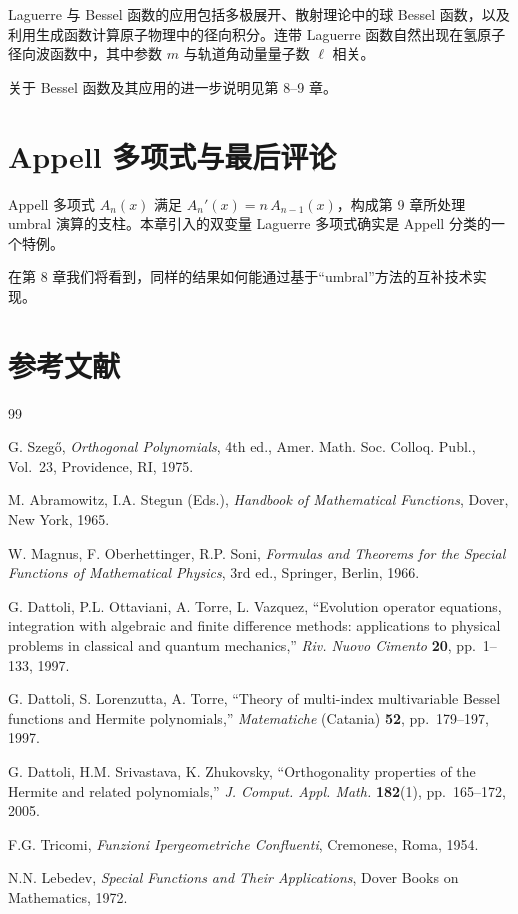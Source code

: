 Laguerre 与 Bessel 函数的应用包括多极展开、散射理论中的球 Bessel 函数，以及利用生成函数计算原子物理中的径向积分。连带 Laguerre 函数自然出现在氢原子径向波函数中，其中参数 $m$ 与轨道角动量量子数 $\ell$ 相关。

关于 Bessel 函数及其应用的进一步说明见第 8--9 章。

\section{Appell 多项式与最后评论}

Appell 多项式 $A_n(x)$ 满足 $A_n'(x) = n\,A_{n-1}(x)$，构成第 9 章所处理 umbral 演算的支柱。本章引入的双变量 Laguerre 多项式确实是 Appell 分类的一个特例。

在第 8 章我们将看到，同样的结果如何能通过基于``umbral''方法的互补技术实现。

\section*{参考文献}

\begin{thebibliography}{99}

G. Szeg\H{o}, \emph{Orthogonal Polynomials}, 4th ed.,
Amer. Math. Soc. Colloq. Publ., Vol.~23, Providence, RI, 1975.

M. Abramowitz, I.A. Stegun (Eds.),
\emph{Handbook of Mathematical Functions},
Dover, New York, 1965.

W. Magnus, F. Oberhettinger, R.P. Soni,
\emph{Formulas and Theorems for the Special Functions of Mathematical Physics},
3rd ed., Springer, Berlin, 1966.

G. Dattoli, P.L. Ottaviani, A. Torre, L. Vazquez,
``Evolution operator equations, integration with algebraic and finite difference
methods: applications to physical problems in classical and quantum
mechanics,''
\emph{Riv. Nuovo Cimento} \textbf{20}, pp.~1--133, 1997.

G. Dattoli, S. Lorenzutta, A. Torre,
``Theory of multi-index multivariable Bessel functions and Hermite
polynomials,''
\emph{Matematiche} (Catania) \textbf{52}, pp.~179--197, 1997.

G. Dattoli, H.M. Srivastava, K. Zhukovsky,
``Orthogonality properties of the Hermite and related polynomials,''
\emph{J. Comput. Appl. Math.} \textbf{182}(1), pp.~165--172, 2005.

F.G. Tricomi,
\emph{Funzioni Ipergeometriche Confluenti},
Cremonese, Roma, 1954.

N.N. Lebedev,
\emph{Special Functions and Their Applications},
Dover Books on Mathematics, 1972.

\end{thebibliography}
